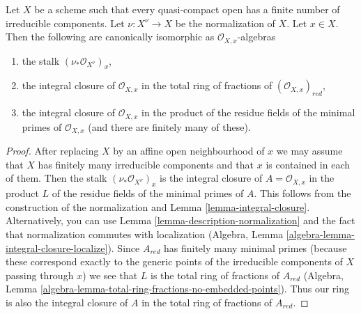 \begin{lemma}
\label{lemma-stalk-normalization}
Let $X$ be a scheme such that every quasi-compact open has a finite
number of irreducible components. Let $\nu : X^\nu \to X$
be the normalization of $X$. Let $x \in X$. Then the following
are canonically isomorphic as $\mathcal{O}_{X, x}$-algebras
\begin{enumerate}
\item the stalk $(\nu_*\mathcal{O}_{X^\nu})_x$,
\item the integral closure of $\mathcal{O}_{X, x}$ in
the total ring of fractions of $(\mathcal{O}_{X, x})_{red}$,
\item the integral closure of $\mathcal{O}_{X, x}$ in the product
of the residue fields of the minimal primes of $\mathcal{O}_{X, x}$
(and there are finitely many of these).
\end{enumerate}
\end{lemma}

\begin{proof}
After replacing $X$ by an affine open neighbourhood
of $x$ we may assume that $X$ has finitely many irreducible
components and that $x$ is contained in each of them.
Then the stalk $(\nu_*\mathcal{O}_{X^\nu})_x$ is the
integral closure of $A = \mathcal{O}_{X, x}$ in the product $L$
of the residue fields of the minimal primes of $A$.
This follows from the construction of the normalization and
Lemma \ref{lemma-integral-closure}.
Alternatively, you can use Lemma
\ref{lemma-description-normalization}
and the fact that normalization commutes with localization
(Algebra, Lemma \ref{algebra-lemma-integral-closure-localize}).
Since $A_{red}$ has finitely many minimal primes
(because these correspond exactly to the generic points
of the irreducible components of $X$ passing through $x$)
we see that $L$ is the total ring of fractions of $A_{red}$
(Algebra, Lemma \ref{algebra-lemma-total-ring-fractions-no-embedded-points}).
Thus our ring is also the integral closure of $A$ in the total
ring of fractions of $A_{red}$.
\end{proof}

